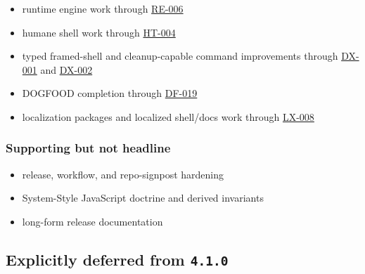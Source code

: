 \begin{itemize}
\tightlist
\item
  runtime engine work through \href{https://github.com/flyingrobots/bijou/blob/cbd70612140e7a450d764b3c7be1c6af878b99bc/docs/design/RE-006-formalize-component-layout-and-interaction-contracts.md}{RE-006}
\item
  humane shell work through \href{https://github.com/flyingrobots/bijou/blob/cbd70612140e7a450d764b3c7be1c6af878b99bc/docs/design/HT-004-promote-explicit-layer-objects-and-richer-shell-introspection.md}{HT-004}
\item
  typed framed-shell and cleanup-capable command improvements through \href{https://github.com/flyingrobots/bijou/blob/cbd70612140e7a450d764b3c7be1c6af878b99bc/docs/design/DX-001-type-framed-app-messages-and-updates-end-to-end.md}{DX-001} and \href{https://github.com/flyingrobots/bijou/blob/cbd70612140e7a450d764b3c7be1c6af878b99bc/docs/design/DX-002-reconcile-cmd-typing-with-cleanup-and-effect-patterns.md}{DX-002}
\item
  DOGFOOD completion through \href{https://github.com/flyingrobots/bijou/blob/cbd70612140e7a450d764b3c7be1c6af878b99bc/docs/design/DF-019-raise-dogfood-coverage-floor-to-100-percent.md}{DF-019}
\item
  localization packages and localized shell/docs work through \href{https://github.com/flyingrobots/bijou/blob/cbd70612140e7a450d764b3c7be1c6af878b99bc/docs/design/LX-008-localize-shell-chrome-and-dogfood.md}{LX-008}
\end{itemize}

\subsubsection{Supporting but not headline}\label{record-202-supporting-but-not-headline}

\begin{itemize}
\tightlist
\item
  release, workflow, and repo-signpost hardening
\item
  System-Style JavaScript doctrine and derived invariants
\item
  long-form release documentation
\end{itemize}

\subsection{\texorpdfstring{Explicitly deferred from \texttt{4\allowbreak{}.\allowbreak{}1\allowbreak{}.\allowbreak{}0}}{Explicitly deferred from }}\label{record-202-explicitly-deferred-from-4.1.0}

